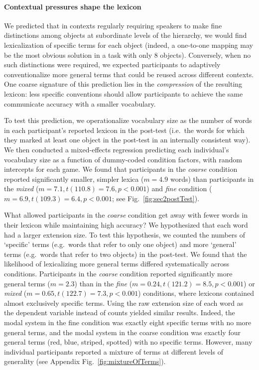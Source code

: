 \paragraph{Contextual pressures shape the lexicon}

We predicted that in contexts regularly requiring speakers to make fine distinctions among objects at subordinate levels of the hierarchy, we would find lexicalization of specific terms for each object (indeed, a one-to-one mapping may be the most obvious solution in a task with only 8 objects). 
Conversely, when no such distinctions were required, we expected participants to adaptively conventionalize more general terms that could be reused across different contexts.
One coarse signature of this prediction lies in the \emph{compression} of the resulting lexicon: less specific conventions should allow participants to achieve the same communicate accuracy with a smaller vocabulary.

To test this prediction, we operationalize vocabulary size as the number of words in each participant's reported lexicon in the post-test (i.e.\ the words for which they marked at least one object in the post-test in an internally consistent way). 
We then conducted a mixed-effects regression predicting each individual's vocabulary size as a function of dummy-coded condition factors, with random intercepts for each game. 
We found that participants in the \emph{coarse} condition reported significantly smaller, simpler lexica ($m = 4.9$ words) than participants in the \emph{mixed} ($m=7.1, t(110.8)=7.6, p < 0.001$) and \emph{fine} condition ($m = 6.9, t(109.3) = 6.4, p < 0.001$; see Fig.~\ref{fig:sec2postTest}). 

What allowed participants in the \emph{coarse} condition get away with fewer words in their lexicon while maintaining high accuracy?
We hypothesized that each word had a larger extension size. 
To test this hypothesis, we counted the numbers of `specific' terms (e.g.~words that refer to only one object) and more `general' terms (e.g.~words that refer to two objects) in the post-test. 
We found that the likelihood of lexicalizing more general terms differed systematically across conditions.
Participants in the \emph{coarse} condition reported significantly more general terms ($m=2.3$) than in the \emph{fine} ($m = 0.24, t(121.2) = 8.5, p < 0.001$) or \emph{mixed} ($m=0.65, t(122.7)= 7.3, p < 0.001$) conditions, where lexicons contained almost exclusively specific terms.
Using the raw extension size of each word as the dependent variable instead of counts yielded similar results.
Indeed, the modal system in the fine condition was exactly eight specific terms with no more general terms, and the modal system in the coarse condition was exactly four general terms (red, blue, striped, spotted) with no specific terms.
However, many individual participants reported a mixture of terms at different levels of generality (see Appendix Fig.~\ref{fig:mixtureOfTerms}). 

